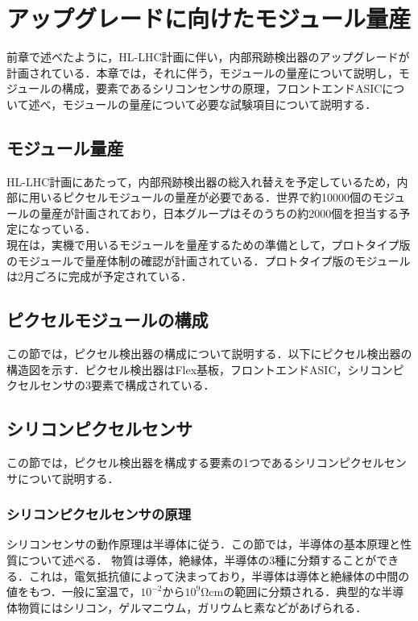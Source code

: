 \chapter{アップグレードに向けたモジュール量産}
前章で述べたように，HL-LHC計画に伴い，内部飛跡検出器のアップグレードが計画されている．本章では，それに伴う，モジュールの量産について説明し，モジュールの構成，要素であるシリコンセンサの原理，フロントエンドASICについて述べ，モジュールの量産について必要な試験項目について説明する．\\

\section{モジュール量産}
HL-LHC計画にあたって，内部飛跡検出器の総入れ替えを予定しているため，内部に用いるピクセルモジュールの量産が必要である．世界で約10000個のモジュールの量産が計画されており，日本グループはそのうちの約2000個を担当する予定になっている．\\
現在は，実機で用いるモジュールを量産するための準備として，プロトタイプ版のモジュールで量産体制の確認が計画されている．プロトタイプ版のモジュールは2月ごろに完成が予定されている．\\

\section{ピクセルモジュールの構成}
この節では，ピクセル検出器の構成について説明する．以下にピクセル検出器の構造図を示す．ピクセル検出器はFlex基板，フロントエンドASIC，シリコンピクセルセンサの3要素で構成されている．\\


\section{シリコンピクセルセンサ}
この節では，ピクセル検出器を構成する要素の1つであるシリコンピクセルセンサについて説明する．

\subsection{シリコンピクセルセンサの原理}
シリコンセンサの動作原理は半導体に従う．この節では，半導体の基本原理と性質について述べる．
物質は導体，絶縁体，半導体の3種に分類することができる．これは，電気抵抗値によって決まっており，半導体は導体と絶縁体の中間の値をもつ．一般に室温で，$10^{-2}$から$10^9 \mathrm{\Omega cm}$の範囲に分類される．典型的な半導体物質にはシリコン，ゲルマニウム，ガリウムヒ素などがあげられる．

